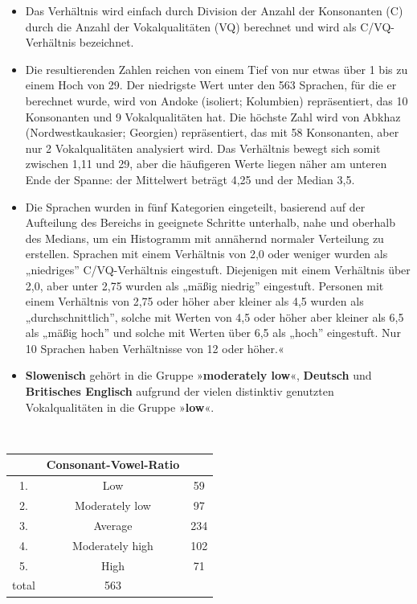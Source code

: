 \documentclass[
  letterpaper,
]{scrbook}
\begin{document}
\begin{itemize}
\item
  Das Verhältnis wird einfach durch Division der Anzahl der Konsonanten
  (C) durch die Anzahl der Vokalqualitäten (VQ) berechnet und wird als
  C/VQ-Verhältnis bezeichnet.
\item
  Die resultierenden Zahlen reichen von einem Tief von nur etwas über 1
  bis zu einem Hoch von 29. Der niedrigste Wert unter den 563 Sprachen,
  für die er berechnet wurde, wird von Andoke (isoliert; Kolumbien)
  repräsentiert, das 10 Konsonanten und 9 Vokalqualitäten hat. Die
  höchste Zahl wird von Abkhaz (Nordwestkaukasier; Georgien)
  repräsentiert, das mit 58 Konsonanten, aber nur 2 Vokalqualitäten
  analysiert wird. Das Verhältnis bewegt sich somit zwischen 1,11 und
  29, aber die häufigeren Werte liegen näher am unteren Ende der Spanne:
  der Mittelwert beträgt 4,25 und der Median 3,5.
\item
  Die Sprachen wurden in fünf Kategorien eingeteilt, basierend auf der
  Aufteilung des Bereichs in geeignete Schritte unterhalb, nahe und
  oberhalb des Medians, um ein Histogramm mit annähernd normaler
  Verteilung zu erstellen. Sprachen mit einem Verhältnis von 2,0 oder
  weniger wurden als „niedriges'' C/VQ-Verhältnis eingestuft. Diejenigen
  mit einem Verhältnis über 2,0, aber unter 2,75 wurden als „mäßig
  niedrig'' eingestuft. Personen mit einem Verhältnis von 2,75 oder
  höher aber kleiner als 4,5 wurden als „durchschnittlich'', solche mit
  Werten von 4,5 oder höher aber kleiner als 6,5 als „mäßig hoch'' und
  solche mit Werten über 6,5 als „hoch'' eingestuft. Nur 10 Sprachen
  haben Verhältnisse von 12 oder höher.«
\item
  \textbf{Slowenisch} gehört in die Gruppe »\textbf{moderately low}«,
  \textbf{Deutsch} und \textbf{Britisches Englisch} aufgrund der vielen
  distinktiv genutzten Vokalqualitäten in die Gruppe »\textbf{low}«. ~
\end{itemize}

~

\begin{longtable}[]{@{}ccc@{}}
\toprule()
~ & \textbf{Consonant-Vowel-Ratio} & ~ \\
\midrule()
\endhead
1. & Low & 59 \\
2. & Moderately low & 97 \\
3. & Average & 234 \\
4. & Moderately high & 102 \\
5. & High & 71 \\
total & 563 & ~ \\
\bottomrule()
\end{longtable}
\end{document}
